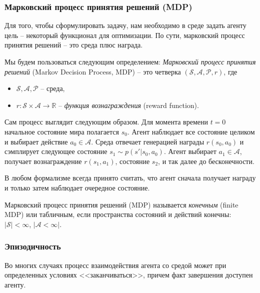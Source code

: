 \documentclass[%
	11pt,
	a4paper,
	utf8,
		]{article}
\begin{document}
\subsubsection{Марковский процесс принятия решений (MDP)}

Для того, чтобы сформулировать задачу, нам необходимо в среде задать агенту цель -- некоторый функционал для оптимизации. По сути, марковский процесс принятия решений -- это среда плюс награда.

Мы будем пользоваться следующим определением: \emph{Марковский процесс принятия решений} (Markov Decision Process, MDP) -- это четверка $ (\mathcal{S}, \mathcal{A}, \mathcal{P}, r) $, где
\begin{itemize}
	\item $ \mathcal{S}, \mathcal{A}, \mathcal{P} $ -- среда,
	
	\item $ r: \mathcal{S} \times \mathcal{A} \rightarrow \mathbb{R} $ -- \emph{функция вознаграждения} (reward function).
\end{itemize}

Сам процесс выглядит следующим образом. Для момента времени $ t = 0 $ начальное состояние мира полагается $ s_0 $. Агент наблюдает все состояние целиком и выбирает действие $ a_0 \in \mathcal{A} $. Среда отвечает генерацией награды $ r(s_0, a_0) $ и сэмплирует следующее состояние $ s_1 \sim p(s' | s_0, a_0) $. Агент выбирает $ a_1 \in \mathcal{A} $, получает вознаграждение $ r(s_1, a_1) $, состояние $ s_2 $, и так далее до бесконечности.


В любом формализме всегда принято считать, что агент сначала получает награду и только затем наблюдает очередное состояние.

Марковский процесс принятия решений (MDP) называется \emph{конечным} (finite MDP) или табличным, если пространства состояний и действий конечны: $ |\mathcal{S}| < \infty $, $ | \mathcal{A} < \infty | $.

\subsubsection{Эпизодичность}

Во многих случаях процесс взаимодействия агента со средой может при определенных условиях <<заканчиваться>>, причем факт завершения доступен агенту.
\end{document}
